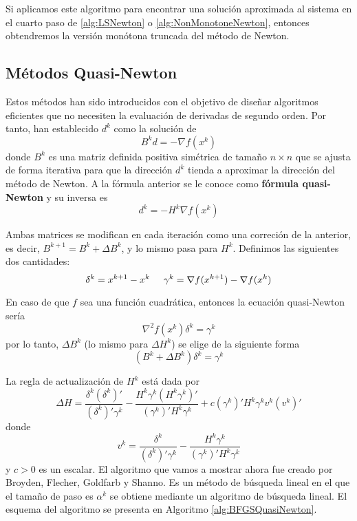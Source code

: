 Si aplicamos este algoritmo para encontrar una solución aproximada al sistema en el cuarto paso de \ref{alg:LSNewton} o \ref{alg:NonMonotoneNewton}, entonces obtendremos la versión monótona truncada del método de Newton.

\subsection{Métodos Quasi-Newton}

Estos métodos han sido introducidos con el objetivo de diseñar algoritmos eficientes que no necesiten la evaluación de derivadas de segundo orden. 
Por tanto, han establecido $d^k$ como la solución de 
\begin{equation}
B^kd = -\nabla f(x^k)
\label{eq:4.27}
\end{equation}
donde $B^k$ es una matriz definida positiva simétrica de tamaño $n\times n$ que se ajusta de forma iterativa para que la dirección $d^k$ tienda a aproximar la dirección del método de Newton. 
A la fórmula anterior se le conoce como \textbf{fórmula quasi-Newton} y su inversa es
\begin{equation}
d^k = - H^k\nabla f(x^k)
\label{eq:4.28}
\end{equation}

Ambas matrices se modifican en cada iteración como una correción de la anterior, es decir, $B^{k+1} = B^k + \Delta B^k$, y lo mismo pasa para $H^k$. 
Definimos las siguientes dos cantidades:
\begin{equation*}
\delta^k = x^{k+1} - x^k \hspace{0.5cm} \gamma^k = \nabla f(x^{k+1}) - \nabla f(x^k)
\end{equation*}

En caso de que $f$ sea una función cuadrática, entonces la ecuación quasi-Newton sería
\begin{equation}
\nabla^2 f(x^k)\delta^k = \gamma^k
\label{eq:4.29}
\end{equation}
por lo tanto, $\Delta B^k$ (lo mismo para $\Delta H^k$) se elige de la siguiente forma
\begin{equation}
(B^k + \Delta B^k)\delta^k = \gamma^k
\label{eq:4.30}
\end{equation}

La regla de actualización de $H^k$ está dada por
\begin{equation}
\Delta H = \dfrac{\delta^k(\delta^k)'}{(\delta^k)'\gamma^k} - \dfrac{H^k\gamma^k(H^k\gamma^k)'}{(\gamma^k)'H^k\gamma^k} + c(\gamma^k)'H^k\gamma^kv^k(v^k)'
\label{eq:4.31}
\end{equation}
donde
\begin{equation*}
v^k = \dfrac{\delta^k}{(\delta^k)'\gamma^k} - \dfrac{H^k\gamma^k}{(\gamma^k)'H^k\gamma^k}
\end{equation*}
y $c>0$ es un escalar. 
El algoritmo que vamos a mostrar ahora fue creado por Broyden, Flecher, Goldfarb y Shanno. 
Es un método de búsqueda lineal en el que el tamaño de paso es $\alpha^k$ se obtiene mediante un algoritmo de búsqueda lineal. 
El esquema del algoritmo se presenta en Algoritmo \ref{alg:BFGSQuasiNewton}.

